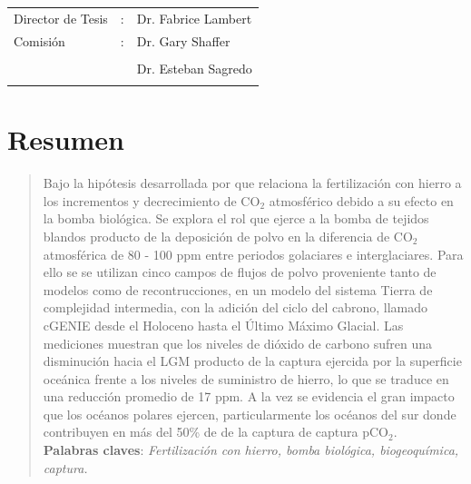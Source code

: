 \documentclass[letterpaper,11pt]{book} %
\begin{document}
\begin{titlepage}
\hspace{4cm}\begin{tabular}[c]{lll}
\large Director de Tesis & : & Dr. Fabrice Lambert \large 
\bigskip %
\\
\large Comisi\'{o}n & : & \large Dr. Gary Shaffer \\ \\
& & \large Dr. Esteban Sagredo\\ \\
\end{tabular} 




\end{titlepage}
\thispagestyle{empty}
\vspace{5cm}
\hspace{7cm}{\Large\it Dedicado a ... :P} %

\setcounter{tocdepth}{1}
\thispagestyle{empty}
\setcounter{page}{1}
\chapter*{Resumen}
\begin{quotation}

Bajo la hipótesis desarrollada por \cite{martin1990glacial} que relaciona la fertilización con hierro a los incrementos y decrecimiento de CO$_2$ atmosférico debido a su efecto en la bomba biológica. Se explora el rol que ejerce a la bomba de tejidos blandos producto de la deposición de polvo en la diferencia de CO$_2$ atmosférica de 80 - 100 ppm entre periodos golaciares e interglaciares. Para ello se se utilizan cinco campos de flujos de polvo proveniente tanto de modelos como de recontrucciones, en un modelo del sistema Tierra de complejidad intermedia, con la adición del ciclo del cabrono, llamado cGENIE desde el Holoceno hasta el Último Máximo Glacial. Las mediciones muestran que los niveles de dióxido de carbono sufren una disminución hacia el LGM producto de la captura ejercida por la superficie oceánica frente a los niveles de suministro de hierro, lo que se traduce en una reducción promedio de 17 ppm. A la vez se evidencia el gran impacto que los océanos polares ejercen, particularmente los océanos del sur donde contribuyen en más del 50\% de de la captura de captura pCO$_2$.\\ 

{\bf Palabras claves}: \textit{Fertilización con hierro, bomba biológica, biogeoquímica, captura.}
\end{quotation}
\end{document}
